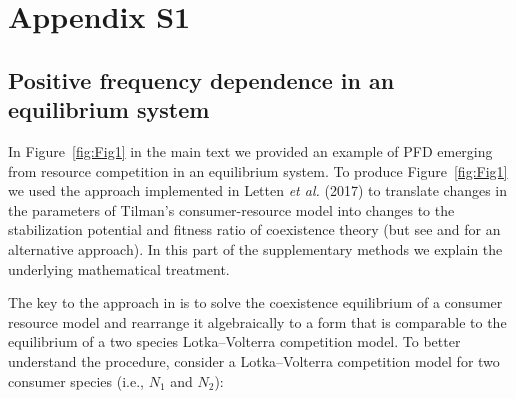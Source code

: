 \begin{comment}
\title{Coexistence theory and the frequency-dependence of priority effects}
\author[1]{Po-Ju Ke \thanks{Both authors contributed equally.}}
\author[1,2,3]{Andrew D. Letten \samethanks}
\affil[1]{Department of Biology, Stanford University, Stanford, California, 94305-5020, USA}
\affil[2]{Centre for Integrative Ecology, University of Canterbury, Christchurch, New Zealand}
\affil[3]{Institute of Integrative Biology, Department of Environmental Systems Science, ETH Z{\"u}rich, 8092 Z{\"u}rich, Switzerland}



\date{}
\maketitle
\blfootnote{Correspondence email: pojuke@stanford.edu, andrew.letten@usys.ethz.ch}
\textbf{Type of article:} Brief Communication\\
\textbf{Number of words:} 1847 [main text] \\
\textbf{References:} 17\\
\textbf{Display items:} 3\\
\end{comment}



\section{Appendix S1}
\subsection{Positive frequency dependence in an equilibrium system}
In Figure~\ref{fig:Fig1} in the main text we provided an example of PFD emerging from resource competition in an equilibrium system. To produce Figure~\ref{fig:Fig1} we used the approach implemented in Letten \textit{et al.} (2017) \citep{Letten2017} to translate changes in the parameters of Tilman's consumer-resource model \citep{tilman1982} into changes to the stabilization potential and fitness ratio of coexistence theory (but see \citep{Meszenaz2006} and \cite{Kleinhesselink2015} for an alternative approach). In this part of the supplementary methods we explain the underlying mathematical treatment. 
\par


The key to the approach in \citep{Letten2017} is to solve the coexistence equilibrium of a consumer resource model and rearrange it algebraically to a form that is comparable to the equilibrium of a two species Lotka--Volterra competition model. To better understand the procedure, consider a Lotka--Volterra competition model for two consumer species (i.e., $N_{1}$ and $N_{2}$):

